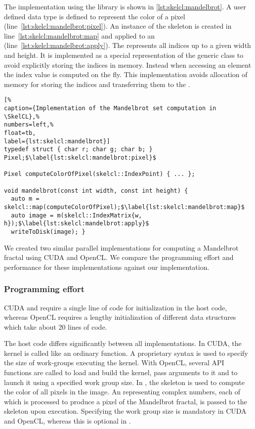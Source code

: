 The implementation using the \SkelCL library is shown in \autoref{lst:skelcl:mandelbrot}.
A user defined data type is defined to represent the color of a pixel (line~\ref{lst:skelcl:mandelbrot:pixel}).
An instance of the \map skeleton is created in line~\ref{lst:skelcl:mandelbrot:map} and applied to an  (line~\ref{lst:skelcl:mandelbrot:apply}).
The  represents all indices up to a given width and height.
It is implemented as a special representation of the generic  class to avoid explicitly storing the indices in memory.
Instead when accessing an element the index value is computed on the fly.
This implementation avoids allocation of memory for storing the indices and transferring them to the \GPU.


\begin{lstlisting}[%                                                             
caption={Implementation of the Mandelbrot set computation in \SkelCL},%
numbers=left,%
float=tb,
label={lst:skelcl:mandelbrot}]
typedef struct { char r; char g; char b; } Pixel;$\label{lst:skelcl:mandelbrot:pixel}$

Pixel computeColorOfPixel(skelcl::IndexPoint) { ... };

void mandelbrot(const int width, const int height) {
  auto m = skelcl::map(computeColorOfPixel);$\label{lst:skelcl:mandelbrot:map}$
  auto image = m(skelcl::IndexMatrix{w, h});$\label{lst:skelcl:mandelbrot:apply}$
  writeToDisk(image); }
\end{lstlisting}

We created two similar parallel implementations for computing a Mandelbrot fractal using CUDA and OpenCL.
We compare the programming effort and performance for these implementations against our \SkelCL implementation.

\subsubsection*{Programming effort}
\label{sec:mandelbrot:programming}

CUDA and \SkelCL require a single line of code for initialization in the host code, whereas OpenCL requires a lengthy initialization of different data structures which take about 20 lines of code.

The host code differs significantly between all implementations.
In CUDA, the kernel is called like an ordinary function.
A proprietary syntax is used to specify the size of work-groups executing the kernel.
With OpenCL, several API functions are called to load and build the kernel, pass arguments to it and to launch it using a specified work group size.
In \SkelCL, the \map skeleton is used to compute the color of all pixels in the image.
An  representing complex numbers, each of which is processed to produce a pixel of the Mandelbrot fractal, is passed to the \map skeleton upon execution.
Specifying the work group size is mandatory in CUDA and OpenCL, whereas this is optional in \SkelCL.

